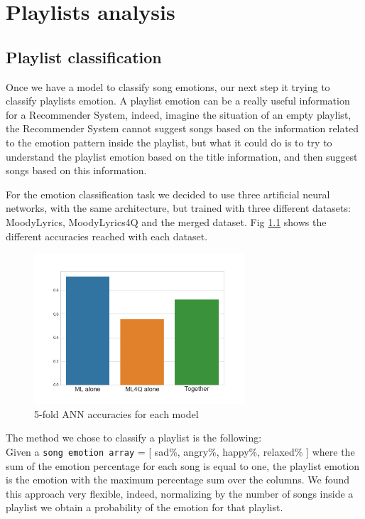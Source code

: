\chapter{Playlists analysis}

\section{Playlist classification}
Once we have a model to classify song emotions, our next step it trying to classify playlists emotion. 
A playlist emotion can be a really useful information for a Recommender System, indeed, imagine the situation of an empty playlist, the Recommender System cannot suggest songs based on the information related to the emotion pattern inside the playlist, but what it could do is to try to understand the playlist emotion based on the title information, and then suggest songs based on this information. \par

For the emotion classification task we decided to use three artificial neural networks, with the same architecture, but trained with three different datasets: MoodyLyrics, MoodyLyrics4Q and the merged dataset. 
Fig \ref{fig:annacc} shows the different accuracies reached with each dataset. 

\begin{figure}[H]
\centering
\includegraphics[width=0.7\textwidth]{./chapters/chapter6/images/ANN_accuracies.png}
\caption{5-fold ANN accuracies for each model}
\label{fig:annacc}
\end{figure}

The method we chose to classify a playlist is the following: \\
Given a \texttt{song emotion array} = [ sad\%, angry\%, happy\%, relaxed\% ] where the sum of the emotion percentage for each song is equal to one, the playlist emotion is the emotion with the maximum percentage sum over the columns. We found this approach very flexible, indeed, normalizing by the number of songs inside a playlist we obtain a probability of the emotion for that playlist. \par

